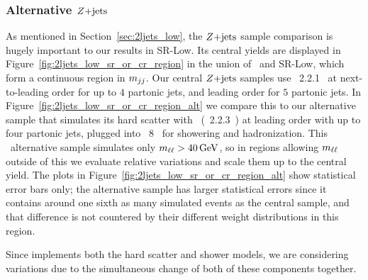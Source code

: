 \subsubsection{Alternative \texorpdfstring{$\zjets$}{Z+jets}}
\label{sec:2ljets_zjets_alt}
As mentioned in Section~\ref{sec:2ljets_low}, the $\zjets$ sample comparison
is hugely important to our results in SR-Low.
Its central yields are displayed in Figure~\ref{fig:2ljets_low_sr_or_cr_region}
in the union of \crz\ and SR-Low, which form a continuous region in $\mjj$.
Our central $\zjets$ samples use \sherpa~2.2.1~\cite{
Bothmann:2019yzt,
Gleisberg:2008ta,
ATL-PHYS-PUB-2016-003
}
at next-to-leading order for up to $4$ partonic jets, and leading order for
$5$ partonic jets.
In Figure~\ref{fig:2ljets_low_sr_or_cr_region_alt} we compare this to our
alternative sample that simulates its hard scatter
with \madgraph\ (\amcatnlo~2.2.3~\cite{Alwall:2014hca}) at leading order with
up to four partonic jets, plugged into \pythia~8~\cite{Sjostrand:2014zea} for
showering and hadronization.
This \madgraph\ alternative sample simulates only $\mll > 40\,\eV[G]$, so in
regions allowing $\mll$ outside of this we evaluate relative variations and
scale them up to the central yield.
The plots in Figure~\ref{fig:2ljets_low_sr_or_cr_region_alt} show statistical
error bars only; the alternative sample has larger statistical errors since
it contains around one sixth as many simulated events as the central sample,
and that difference is not countered by their different weight distributions
in this region.

Since \sherpa implements both the hard scatter and shower models, we are
considering variations due to the simultaneous change of both of these
components together.

